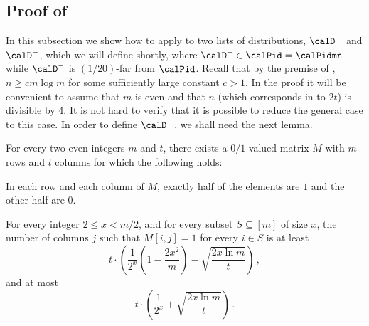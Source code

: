 %

\DetailsWish

%


\subsection{Proof of }\label{id-lb-proof.subsec}
%
In this subsection we show how to
apply  to two lists of distributions,
$\calD^+$ and $\calD^-$,
which we will define shortly,
where $\calD^+ \in \calPid = \calPidmn$  while
$\calD^-$ is $(1/20)$-far from $\calPid$.
%
Recall that by the premise of ,
%
$n \geq cm\log m$ for some sufficiently large constant $c > 1$.
In the proof it will be convenient to assume that $m$ is even and
that $n$ (which corresponds in  to $2t$) is divisible by 4. It is not hard to verify that it is
possible to reduce the general case to this case.
%
%
%
In order to define $\calD^-$, we shall need the next lemma.
%
%
\begin{lemma} \label{NOT.lem}
For every two even integers $m$ and $t$,
%
there exists a $0/1$-valued matrix $M$ with $m$ rows and $t$ columns for which the
following holds:
\BE
\item In each row and each column of $M$, exactly half of the elements are $1$ and
the other half are $0$.
\item\sloppy For every integer $2 \leq x < m/2$,
 and for every subset $S \subseteq [m]$ of size $x$,
%
the number of columns $j$ such that $M[i,j] =1$ for every $i \in S$
is at least
\[
t\cdot\left(\frac{1}{2^x}\left(1- \frac{2x^2}{m}\right) -
  \sqrt{\frac{2x\ln m}{t}}\right)\,,
\]
and at most
%
\[
t\cdot\left(\frac{1}{2^x} + \sqrt{\frac{2x\ln m}{t}}\right)\,.
\]
\EE
\end{lemma}
























